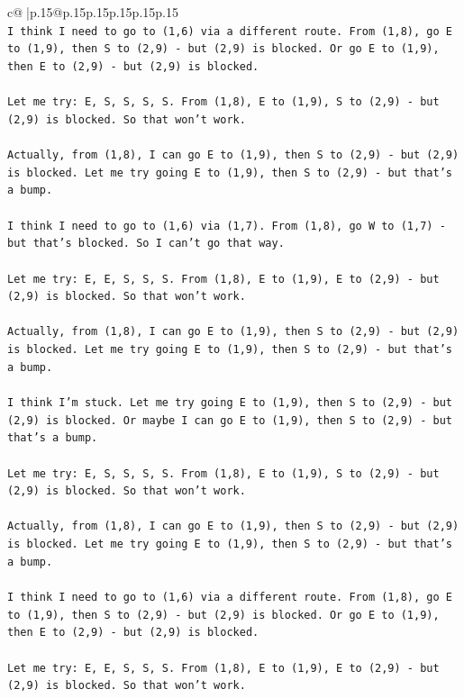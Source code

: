 \documentclass{article}
\begin{document}
{\begin{supertabular}{c@{$\;$}|p{.15\linewidth}@{}p{.15\linewidth}p{.15\linewidth}p{.15\linewidth}p{.15\linewidth}p{.15\linewidth}}
{{{\\ 
\texttt{I think I need to go to (1,6) via a different route. From (1,8), go E to (1,9), then S to (2,9) {-} but (2,9) is blocked. Or go E to (1,9), then E to (2,9) {-} but (2,9) is blocked.} \\
\\ 
\texttt{Let me try: E, S, S, S, S. From (1,8), E to (1,9), S to (2,9) {-} but (2,9) is blocked. So that won't work.} \\
\\ 
\texttt{Actually, from (1,8), I can go E to (1,9), then S to (2,9) {-} but (2,9) is blocked. Let me try going E to (1,9), then S to (2,9) {-} but that's a bump.} \\
\\ 
\texttt{I think I need to go to (1,6) via (1,7). From (1,8), go W to (1,7) {-} but that's blocked. So I can't go that way.} \\
\\ 
\texttt{Let me try: E, E, S, S, S. From (1,8), E to (1,9), E to (2,9) {-} but (2,9) is blocked. So that won't work.} \\
\\ 
\texttt{Actually, from (1,8), I can go E to (1,9), then S to (2,9) {-} but (2,9) is blocked. Let me try going E to (1,9), then S to (2,9) {-} but that's a bump.} \\
\\ 
\texttt{I think I'm stuck. Let me try going E to (1,9), then S to (2,9) {-} but (2,9) is blocked. Or maybe I can go E to (1,9), then S to (2,9) {-} but that's a bump.} \\
\\ 
\texttt{Let me try: E, S, S, S, S. From (1,8), E to (1,9), S to (2,9) {-} but (2,9) is blocked. So that won't work.} \\
\\ 
\texttt{Actually, from (1,8), I can go E to (1,9), then S to (2,9) {-} but (2,9) is blocked. Let me try going E to (1,9), then S to (2,9) {-} but that's a bump.} \\
\\ 
\texttt{I think I need to go to (1,6) via a different route. From (1,8), go E to (1,9), then S to (2,9) {-} but (2,9) is blocked. Or go E to (1,9), then E to (2,9) {-} but (2,9) is blocked.} \\
\\ 
\texttt{Let me try: E, E, S, S, S. From (1,8), E to (1,9), E to (2,9) {-} but (2,9) is blocked. So that won't work.} \\
\\ 
}}}
\end{supertabular}}
\end{document}
